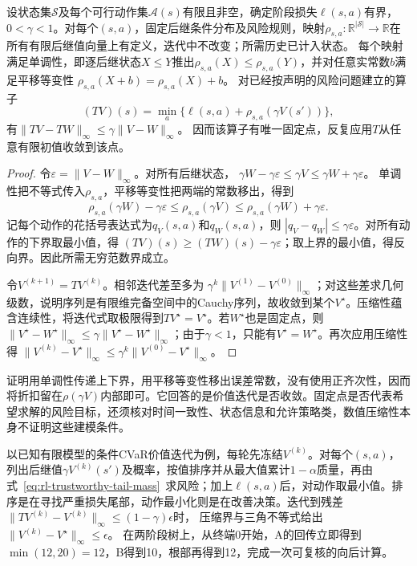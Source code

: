\begin{theorem}[折扣风险算子的压缩性]
  \label{thm:rl-trustworthy-risk-contraction}
  设状态集$\mathcal S$及每个可行动作集$\mathcal A(s)$有限且非空，确定阶段损失$\ell(s,a)$有界，$0<\gamma<1$。对每个$(s,a)$，固定后继条件分布及风险规则，映射$\rho_{s,a}:\mathbb R^{|\mathcal S|}\to\mathbb R$在所有有限后继值向量上有定义，迭代中不改变；所需历史已计入状态。
  每个映射满足单调性，即逐后继状态$X\leq Y$推出$\rho_{s,a}(X)\leq\rho_{s,a}(Y)$，并对任意实常数$b$满足平移等变性
  $\rho_{s,a}(X+b)=\rho_{s,a}(X)+b$。
  对已经按声明的风险问题建立的算子
  \[
    (TV)(s)=\min_a\{\ell(s,a)+\rho_{s,a}(\gamma V(s'))\},
  \]
  有$\lVert TV-TW\rVert_\infty\leq\gamma\lVert V-W\rVert_\infty$。
  因而该算子有唯一固定点，反复应用$T$从任意有限初值收敛到该点。
\end{theorem}
\begin{proof}
  令$\varepsilon=\lVert V-W\rVert_\infty$。对所有后继状态，
  $\gamma W-\gamma\varepsilon\leq\gamma V\leq\gamma W+\gamma\varepsilon$。
  单调性把不等式传入$\rho_{s,a}$，平移等变性把两端的常数移出，得到
  \[
    \rho_{s,a}(\gamma W)-\gamma\varepsilon
      \leq\rho_{s,a}(\gamma V)
      \leq\rho_{s,a}(\gamma W)+\gamma\varepsilon.
  \]
  记每个动作的花括号表达式为$q_V(s,a)$和$q_W(s,a)$，则
  $|q_V-q_W|\leq\gamma\varepsilon$。对所有动作的下界取最小值，得
  $(TV)(s)\geq(TW)(s)-\gamma\varepsilon$；取上界的最小值，得反向界。因此所需无穷范数界成立。

  令$V^{(k+1)}=TV^{(k)}$。相邻迭代差至多为
  $\gamma^k\lVert V^{(1)}-V^{(0)}\rVert_\infty$；对这些差求几何级数，说明序列是有限维完备空间中的Cauchy序列，故收敛到某个$V^\star$。压缩性蕴含连续性，将迭代式取极限得到$TV^\star=V^\star$。若$W^\star$也是固定点，则
  $\lVert V^\star-W^\star\rVert_\infty\leq\gamma\lVert V^\star-W^\star\rVert_\infty$；由于$\gamma<1$，只能有$V^\star=W^\star$。再次应用压缩性得
  $\lVert V^{(k)}-V^\star\rVert_\infty\leq\gamma^k\lVert V^{(0)}-V^\star\rVert_\infty$。
\end{proof}

证明用单调性传递上下界，用平移等变性移出误差常数，没有使用正齐次性，因而将折扣留在$\rho(\gamma V)$内部即可。它回答的是价值迭代是否收敛。固定点是否代表希望求解的风险目标，还须核对时间一致性、状态信息和允许策略类，数值压缩性本身不证明这些建模条件。

以已知有限模型的条件CVaR价值迭代为例，每轮先冻结$V^{(k)}$。对每个$(s,a)$，列出后继值$\gamma V^{(k)}(s')$及概率，按值排序并从最大值累计$1-\alpha$质量，再由式~\eqref{eq:rl-trustworthy-tail-mass}~求风险；加上$\ell(s,a)$后，对动作取最小值。排序是在寻找严重损失尾部，动作最小化则是在改善决策。迭代到残差
$\lVert TV^{(k)}-V^{(k)}\rVert_\infty\leq(1-\gamma)\epsilon$时，
压缩界与三角不等式给出
$\lVert V^{(k)}-V^\star\rVert_\infty\leq\epsilon$。
在两阶段树上，从终端0开始，A的回传立即得到$\min(12,20)=12$，B得到10，根部再得到12，完成一次可复核的向后计算。


